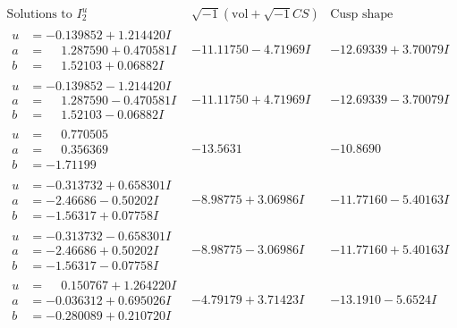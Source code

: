 \documentclass[1p]{elsarticle_modified}
\theoremstyle{definition}
\newcommand{\I}{\sqrt{-1}}
\begin{document}
$$\begin{array}{c|c|c}  
\text{Solutions to }I^u_{2}& \I (\text{vol} + \sqrt{-1}CS) & \text{Cusp shape}\\
 \hline 
\begin{aligned}
u &= -0.139852 + 1.214420 I \\
a &= \phantom{-}1.287590 + 0.470581 I \\
b &= \phantom{-}1.52103 + 0.06882 I\end{aligned}
 & -11.11750 - 4.71969 I & -12.69339 + 3.70079 I \\ \hline\begin{aligned}
u &= -0.139852 - 1.214420 I \\
a &= \phantom{-}1.287590 - 0.470581 I \\
b &= \phantom{-}1.52103 - 0.06882 I\end{aligned}
 & -11.11750 + 4.71969 I & -12.69339 - 3.70079 I \\ \hline\begin{aligned}
u &= \phantom{-}0.770505\phantom{ +0.000000I} \\
a &= \phantom{-}0.356369\phantom{ +0.000000I} \\
b &= -1.71199\phantom{ +0.000000I}\end{aligned}
 & -13.5631\phantom{ +0.000000I} & -10.8690\phantom{ +0.000000I} \\ \hline\begin{aligned}
u &= -0.313732 + 0.658301 I \\
a &= -2.46686 - 0.50202 I \\
b &= -1.56317 + 0.07758 I\end{aligned}
 & -8.98775 + 3.06986 I & -11.77160 - 5.40163 I \\ \hline\begin{aligned}
u &= -0.313732 - 0.658301 I \\
a &= -2.46686 + 0.50202 I \\
b &= -1.56317 - 0.07758 I\end{aligned}
 & -8.98775 - 3.06986 I & -11.77160 + 5.40163 I \\ \hline\begin{aligned}
u &= \phantom{-}0.150767 + 1.264220 I \\
a &= -0.036312 + 0.695026 I \\
b &= -0.280089 + 0.210720 I\end{aligned}
 & -4.79179 + 3.71423 I & -13.1910 - 5.6524 I \\ \hline\begin{aligned}

\end{aligned}
\end{array}$$
\end{document}
